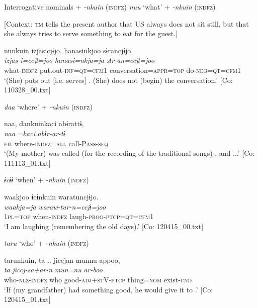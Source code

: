 \ea \label{ex:7:22}  Interrogative nominals + \textit{{}-nkuin} (\textsc{indfz})
\ea \label{ex:7:22a}\textit{nuu} ‘what’ + \textit{{}-nkuin} (\textsc{indfz})

    [Context: \textsc{tm} tells the present author that US always does not sit still, but that she always tries to serve something to eat for the guest.]

{\TM}
\glll nunkuin  izjasicjɨjo.  hanasinkjoo  sɨrancjɨjo.\\
\textit{}  \textit{izjas-i=ccjɨ=joo}  \textit{hanasi=nkja=ja}  \textit{sɨr-an=ccjɨ=joo}\\
      what-\textsc{indfz}  put.out-\textsc{inf}=\textsc{qt}=\textsc{cfm}1  conversation=\textsc{appr}=\textsc{top}                  do-\textsc{neg}=\textsc{qt}=\textsc{cfm1}\\
\glt    ‘(She) puts out [i.e. serves] . (She) does not (begin) the conversation.’      [Co: 110328\_00.txt]

\ex \label{ex:7:22b}\textit{daa} ‘where’ + \textit{{}-nkuin} (\textsc{indfz})

{\TM}
\glll  naa,  dankuinkaci  abɨrattɨ,\\
\textit{naa}  \textit{=kaci}  \textit{abɨr-ar-tɨ}\\
\textsc{fil}  where-\textsc{indfz}=\textsc{all}  call-P\textsc{ass}-\textsc{seq}\\
\glt ‘(My mother) was called (for the recording of the traditional songs) , and ...’ [Co: 111113\_01.txt]

\ex \label{ex:7:22c}\textit{ɨcɨɨ} ‘when’ + \textit{{}-nkuin} (\textsc{indfz})

{\TM}
\glll  waakjoo  ɨcɨnkuin  waratuncjɨjo.\\
\textit{waakja=ja}  \textit{}  \textit{waraw-tur-n=ccjɨ=joo}\\
1\textsc{pl}=\textsc{top}  when-\textsc{indfz}  laugh-\textsc{prog}-\textsc{ptcp}=\textsc{qt}=\textsc{cfm}1\\
\glt ‘I am  laughing (remembering the old days).’ [Co: 120415\_00.txt]

\ex \label{ex:7:22d}\textit{taru} ‘who’ + \textit{{}-nkuin} (\textsc{indfz})

{\TM}
\glll  tarunkuin,  ta ..  jiccjan  munnu  appoo,\\
\textit{}  \textit{ta}  \textit{jiccj-sa+ar-n}  \textit{mun=nu}  \textit{ar-boo}\\
who-\textsc{nlz}-\textsc{indfz}  who  good-\textsc{adj}+\textsc{st}V-\textsc{ptcp}  thing=\textsc{nom}  exist-\textsc{cnd}\\
\glt ‘If (my grandfather) had something good, he would give it to .’ [Co: 120415\_01.txt]

